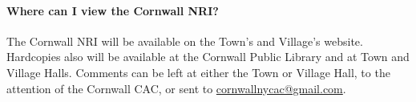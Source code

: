 \paragraph{Where can I view the Cornwall NRI?} The Cornwall NRI will be 
available on the Town’s and Village’s website. Hardcopies also will be 
available at the Cornwall Public Library and at Town and Village Halls. 
Comments can be left at either the Town or Village Hall, to the attention of 
the Cornwall CAC, or sent to 
\href{mailto:cornwallnycac@gmail.com}{cornwallnycac@gmail.com}.